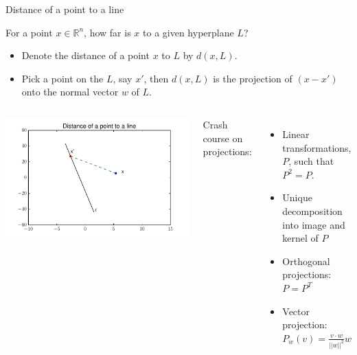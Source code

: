 \documentclass{beamer}
\begin{document}
\begin{frame}{Distance of a point to a line}

For a point $x \in \mathbb{R}^n$, how far is $x$ to a given hyperplane $L$?
\begin{itemize}
    \item Denote the distance of a point $x$ to $L$ by $d(x,L)$.
    \item Pick a point on the $L$, say $x'$, then $d(x,L)$ is the projection of $(x-x')$ onto the normal vector $w$ of $L$.
\end{itemize}

\begin{columns}
\includegraphics[scale=0.4225]{figures/proj.pdf}

Crash course on projections:
\begin{itemize}
    \item Linear transformations, $P$, such that $P^2=P$.
    \item Unique decomposition into image and kernel of $P$
    \item Orthogonal projections: $P=P^T$
    \item Vector projection: $P_w(v)=\frac{v\cdot w}{||w||^2}w$
\end{itemize}
\end{columns}

\end{frame}

\end{document}
